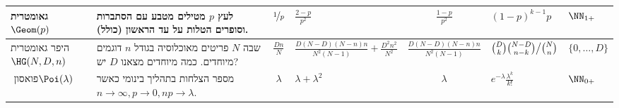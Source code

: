 \documentclass[8pt,twocolumn]{extarticle}
\begin{document}
{{\begin{minipage}{\columnwidth}
\begin{sideways}
\begin{tabular}{ R{1.7cm} | R{2.8cm} | c | C{2.1cm} | c | C{2.1cm} | C{1.7cm}}
          גאומטרית
          \null \hspace*{\fill} \(\Geom(p)\)
                   & מטילים מטבע עם הסתברות ‎\(p\) לעץ וסופרים הטלות על עד הראשון (כולל).
          & ‎\(\nicefrac{1}{p}\)
                  & ‎\(\frac{2-p}{p^2}\)
                            & ‎\(\frac{1-p}{p^2}\)
                                     & ‎\((1-p)^{k-1}p\)
                                                  & ‎\(\NN_{1+}\) \\
          \hline
          היפר גאומטרית \hspace*{\fill} \(\HG(N,D,n)\)
                   & דוגמים ‎\(n\) פריטים מאוכלוסיה בגודל ‎\(N\) שבה יש ‎\(D\) מיוחדים.
                     כמה מיוחדים מצאנו?
          & ‎\(\frac{Dn}{N}\)
                  & ‎\(\frac{D(N-D)(N-n)n}{N^2(N-1)} +\frac{D^2n^2}{N^2}\)
                            & ‎\(\frac{D(N-D)(N-n)n}{N^2(N-1)}\)
                                     & ‎\(\binom{D}{k}\binom{N-D}{n-k}\big{/}\binom{N}{n}\)
                                                  & ‎\(\{0, \dots ,D\}\) \\

          \hline
          פואסון
          \hspace*{\fill}‏\(\Poi(\lambda)\)
                   & מספר הצלחות בתהליך בינומי כאשר ‎\(n\to \infty , p\to 0, n p\to \lambda \).
          & ‎\(\lambda \)
                  & ‎\(\lambda + \lambda^2\)
                            & ‎\(\lambda\)
                                     & ‎\(e^{-\lambda} \frac{\lambda^k}{k!}\)
                                                  & ‎\(\NN_{0+}\)
        \end{tabular}
\end{sideways}
\end{minipage}}}
\fi
\end{document}
